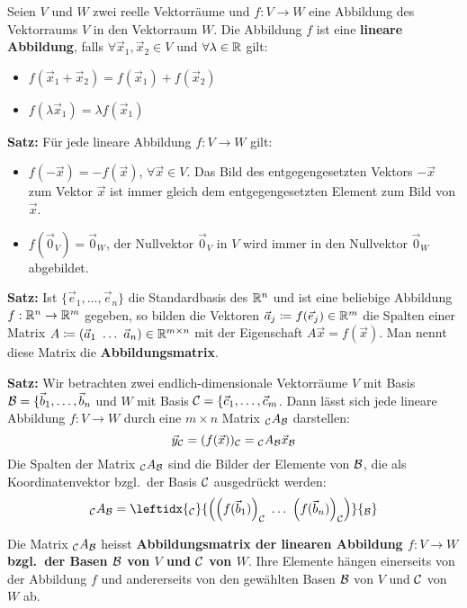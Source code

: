 

Seien $V$ und $W$ zwei reelle Vektorräume und $f: V \rightarrow W$ eine Abbildung des Vektorraums $V$ in den Vektorraum $W$.
Die Abbildung $f$ ist eine \textbf{lineare Abbildung}, falls $\forall \vec{x}_1, \vec{x}_2 \in V$ und $\forall \lambda \in \mathbb{R}$ gilt:
\begin{itemize}
    \item $f(\vec{x}_1 + \vec{x}_2) = f(\vec{x}_1) + f(\vec{x}_2)$
    \item $f(\lambda \vec{x}_1) = \lambda f(\vec{x}_1)$
\end{itemize}

\textbf{Satz:} Für jede lineare Abbildung $f: V \rightarrow W$ gilt:
\begin{itemize}
    \item $f(-\vec{x}) = -f(\vec{x})$, $\forall \vec{x} \in V$.
    Das Bild des entgegengesetzten Vektors $-\vec{x}$ zum Vektor $\vec{x}$ ist immer gleich dem entgegengesetzten Element zum Bild von $\vec{x}$.
    \item $f(\vec{0}_V) = \vec{0}_W$, der Nullvektor $\vec{0}_V$ in $V$ wird immer in den Nullvektor $\vec{0}_W$ abgebildet.
\end{itemize}

\textbf{Satz:} Ist $\{ \vec{e}_1, \dots, \vec{e}_n \}$ die Standardbasis des $\mathbb{R}^n$ und ist eine beliebige Abbildung $f: \mathbb{R}^n \rightarrow \mathbb{R}^m$ gegeben, so bilden die Vektoren $\vec{a}_j \coloneqq f(\vec{e}_j) \in \mathbb{R}^m$ die Spalten einer Matrix $A \coloneqq (\vec{a}_1 \ \dots \ \vec{a}_n) \in \mathbb{R}^{m \times n}$ mit der Eigenschaft $A \vec{x} = f(\vec{x})$.
Man nennt diese Matrix die \textbf{Abbildungsmatrix}.

\textbf{Satz:} Wir betrachten zwei endlich-dimensionale Vektorräume $V$ mit Basis $\mathcal{B} = \{\vec{b}_1, \dots, \vec{b}_n$ und $W$ mit Basis $\mathcal{C} = \{\vec{c}_1, \dots, \vec{c}_m$.
Dann lässt sich jede lineare Abbildung $f: V \rightarrow W$ durch eine $m \times n$ Matrix ${}_{\mathcal{C}} A_{\mathcal{B}}$ darstellen:
\[\vec{y}_{\mathcal{C}} = (f(\vec{x}))_{\mathcal{C}} = {}_{\mathcal{C}} A_{\mathcal{B}} \vec{x}_{\mathcal{B}}\]
Die Spalten der Matrix ${}_{\mathcal{C}} A_{\mathcal{B}}$ sind die Bilder der Elemente von $\mathcal{B}$, die als Koordinatenvektor bzgl.\ der Basis $\mathcal{C}$ ausgedrückt werden:
\[{}_{\C} A_{\B} = \leftidx{_\C}{\left( \left( f(\vec{b}_1) \right)_{\C} \ \dots \ \left( f(\vec{b}_n) \right)_{\C} \right)}{_\B}\]

Die Matrix ${}_{\mathcal{C}} A_{\mathcal{B}}$ heisst \textbf{Abbildungsmatrix der linearen Abbildung $f: V \rightarrow W$ bzgl.\ der Basen $\mathcal{B}$ von $V$ und $\mathcal{C}$ von $W$}.
Ihre Elemente hängen einerseits von der Abbildung $f$ und andererseits von den gewählten Basen $\mathcal{B}$ von $V$ und $\mathcal{C}$ von $W$ ab.

